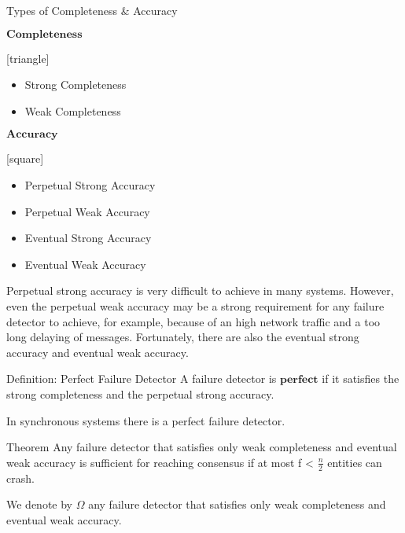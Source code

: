 \documentclass{beamer}
\begin{document}
\begin{frame}{Types of Completeness $\&$ Accuracy}
\begin{block}{}
$\textbf{Completeness}$
\begin{flushleft}
[triangle]
\begin{itemize}
\item Strong Completeness
\item Weak Completeness
\end{itemize}
\end{flushleft}
\end{block}
\pause
\begin{block}{}
$\textbf{Accuracy}$
\begin{flushleft}
[square]
\begin{itemize}
\item Perpetual Strong Accuracy
\item Perpetual Weak Accuracy
\item Eventual Strong Accuracy
\item Eventual Weak Accuracy
\end{itemize}
\end{flushleft}
\end{block}
\end{frame}

\begin{frame}
Perpetual strong accuracy is very difficult to achieve in many systems. However, even the perpetual weak accuracy may be a strong requirement for any failure detector to achieve, for example, because of an high network traffic and a too long delaying of messages. Fortunately, there are also the eventual strong accuracy and eventual weak accuracy.
\begin{flushleft}
\end{flushleft}
\begin{block}{Definition: Perfect Failure Detector }
A failure detector is $\textbf{perfect}$ if it satisfies the strong completeness and the perpetual strong accuracy.
\end{block}
In synchronous systems there is a perfect failure detector.
\end{frame}

\begin{frame}
\begin{block}{Theorem}
Any failure detector that satisfies only weak completeness and eventual weak accuracy is sufficient for reaching consensus if at most f < $\frac{n}{2}$ entities can crash.
\end{block}
\begin{flushleft}
\end{flushleft}
\begin{flushleft}
We denote by $\Omega$ any failure detector that satisfies only weak completeness and eventual weak accuracy.
\end{flushleft}
\end{frame}
\end{document}
